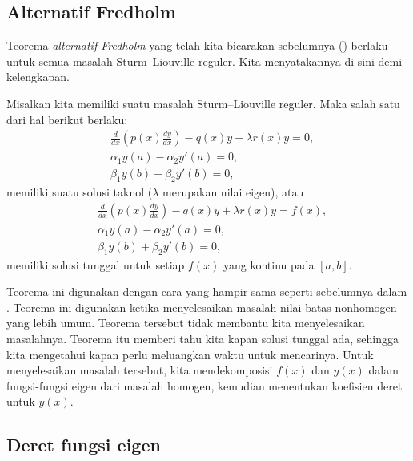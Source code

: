 \subsection{Alternatif Fredholm}

Teorema \emph{alternatif Fredholm} yang telah kita bicarakan sebelumnya
()
berlaku untuk semua masalah Sturm--Liouville reguler.
Kita menyatakannya di sini demi kelengkapan.

\begin{theorem}%
Misalkan kita memiliki suatu masalah Sturm--Liouville reguler.
Maka salah satu dari hal berikut berlaku:
\begin{align*}
&\frac{d}{dx} \left( p(x) \frac{dy}{dx} \right)
- q(x) y + \lambda r(x) y = 0 , \\
&\alpha_1 y(a) - \alpha_2 y'(a) = 0 , \\
&\beta_1 y(b) + \beta_2 y'(b) = 0 ,
\end{align*}
memiliki suatu solusi taknol ($\lambda$ merupakan nilai eigen), atau
\begin{align*}
&\frac{d}{dx} \left( p(x) \frac{dy}{dx} \right)
- q(x) y + \lambda r(x) y = f(x) , \\
&\alpha_1 y(a) - \alpha_2 y'(a) = 0 , \\
&\beta_1 y(b) + \beta_2 y'(b) = 0 ,
\end{align*}
memiliki solusi tunggal untuk setiap $f(x)$ yang kontinu pada $[a,b]$.
\end{theorem}

Teorema ini digunakan dengan cara yang hampir sama seperti sebelumnya dalam
.  Teorema ini digunakan ketika menyelesaikan masalah nilai batas
nonhomogen yang lebih umum.  Teorema tersebut tidak membantu kita menyelesaikan masalahnya.
Teorema itu memberi tahu kita kapan solusi tunggal ada, sehingga
kita mengetahui kapan perlu meluangkan waktu untuk mencarinya.  Untuk menyelesaikan masalah tersebut,
kita mendekomposisi $f(x)$ dan $y(x)$ dalam fungsi-fungsi eigen dari masalah
homogen,
kemudian menentukan koefisien deret untuk $y(x)$.

\subsection{Deret fungsi eigen}

